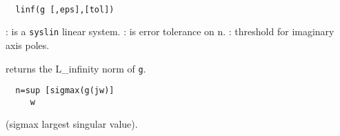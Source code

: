 \begin{mandesc}
   \\ %
\end{mandesc}
\begin{calling_sequence}
\begin{verbatim}
  linf(g [,eps],[tol])   
\end{verbatim}
\end{calling_sequence}
\begin{parameters}
  \begin{varlist}
    : is a \verb!syslin! linear system.
    : is error tolerance on n.
    : threshold for imaginary axis poles.
  \end{varlist}
\end{parameters}
\begin{mandescription}
  returns the L\_infinity norm of \verb!g!.
\begin{verbatim}
  n=sup [sigmax(g(jw)] 
     w
\end{verbatim}
(sigmax largest singular value).
\end{mandescription}
\begin{manseealso}
     
\end{manseealso}
